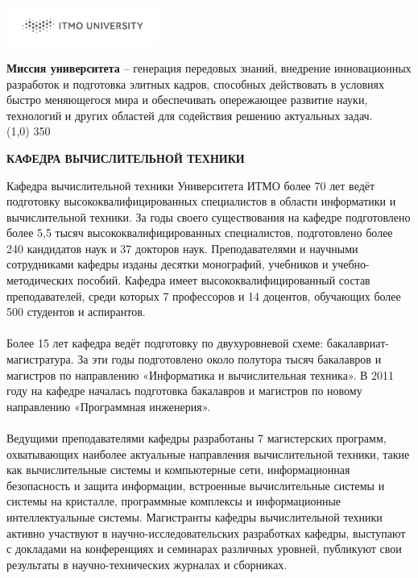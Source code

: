 \documentclass[a5paper,14pt]{report}
\begin{document}
\pagestyle{empty}
\begin{flushright}
\includegraphics[width=5cm]{ITMO_log}
\end{flushright}
\textbf{Миссия университета} -- генерация передовых знаний, внедрение инновационных разработок и подготовка элитных кадров, способных действовать в условиях быстро меняющегося мира и обеспечивать опережающее развитие науки, технологий и других областей для содействия решению актуальных задач. 
\\\line(1,0) {350}
\begin{center}
\textbf{КАФЕДРА ВЫЧИСЛИТЕЛЬНОЙ ТЕХНИКИ}
\end{center}
Кафедра вычислительной техники Университета ИТМО более 70 лет ведёт подготовку высококвалифицированных специалистов в области информатики и вычислительной техники. За годы своего существования на кафедре подготовлено более 5,5 тысяч высококвалифицированных специалистов, подготовлено более 240 кандидатов наук и 37 докторов наук. Преподавателями и научными сотрудниками кафедры изданы десятки монографий, учебников и учебно-методических пособий. Кафедра имеет высококвалифицированный состав преподавателей, среди которых 7 профессоров и 14 доцентов, обучающих более 500 студентов и аспирантов.
\\\\Более 15 лет кафедра ведёт подготовку по двухуровневой схеме: бакалавриат-магистратура. За эти годы подготовлено около полутора тысяч бакалавров и магистров по направлению «Информатика и вычислительная техника». В 2011 году на кафедре началась подготовка бакалавров и магистров по новому направлению «Программная инженерия». 
\\\\Ведущими преподавателями кафедры разработаны 7 магистерских программ, охватывающих наиболее актуальные направления вычислительной техники, такие как вычислительные системы и компьютерные сети, информационная безопасность и защита информации, встроенные вычислительные системы и системы на кристалле, программные комплексы и информационные интеллектуальные системы. Магистранты кафедры вычислительной техники активно участвуют в научно-исследовательских разработках кафедры, выступают с докладами на конференциях и семинарах различных уровней, публикуют свои результаты в научно-технических журналах и сборниках.
\end{document}
